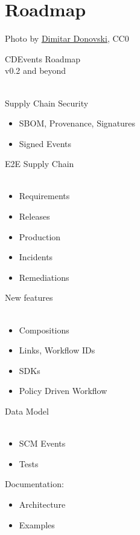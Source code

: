 \documentclass[aspectratio=169,11pt,hyperref={colorlinks=true}]{beamer}
\begin{document}
\section{Roadmap}
\begin{sectionwithpiclargecentral}{Photo by \href{https://unsplash.com/@dmtrdon}{\underline{Dimitar Donovski}}, CC0}
\end{sectionwithpiclargecentral}

\begin{stripedframe}%
  {%
  CDEvents Roadmap \\
  v0.2 and beyond \\
  ~
  }%
  {%
  Supply Chain Security
  \begin{itemize}
    \item SBOM, Provenance, Signatures
  \end{itemize}
  \begin{itemize}
    \item Signed Events
  \end{itemize}
  }%
  {%
  E2E Supply Chain \\
  ~
  \begin{itemize}
    \item Requirements
    \item Releases
    \item Production
    \item Incidents
    \item Remediations
  \end{itemize}
  }%
  {%
  New features \\
  ~
  \begin{itemize}
    \item Compositions
    \item Links, Workflow IDs
    \item SDKs
    \item Policy Driven Workflow
  \end{itemize}
  }%
  {%
  Data Model \\
  ~
  \begin{itemize}
    \item SCM Events
    \item Tests
  \end{itemize}
  Documentation:
  \begin{itemize}
    \item Architecture
    \item Examples
  \end{itemize}
  }%
\end{stripedframe}
\end{document}
